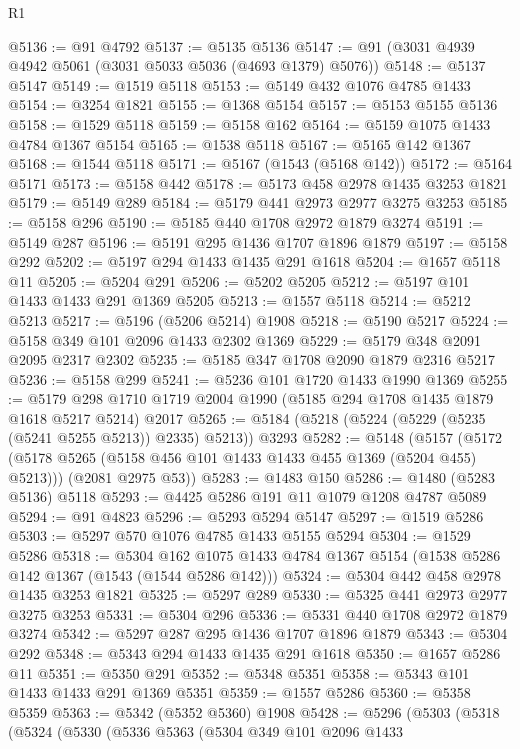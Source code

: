\begin{lexlean}{R1}
\begin{coremodule}
@5136 := @91 @4792
@5137 := @5135 @5136
@5147 := @91 (@3031 @4939 @4942 @5061 (@3031 @5033 @5036 (@4693 @1379) @5076))
@5148 := @5137 @5147
@5149 := @1519 @5118
@5153 := @5149 @432 @1076 @4785 @1433
@5154 := @3254 @1821
@5155 := @1368 @5154
@5157 := @5153 @5155 @5136
@5158 := @1529 @5118
@5159 := @5158 @162
@5164 := @5159 @1075 @1433 @4784 @1367 @5154
@5165 := @1538 @5118
@5167 := @5165 @142 @1367
@5168 := @1544 @5118
@5171 := @5167 (@1543 (@5168 @142))
@5172 := @5164 @5171
@5173 := @5158 @442
@5178 := @5173 @458 @2978 @1435 @3253 @1821
@5179 := @5149 @289
@5184 := @5179 @441 @2973 @2977 @3275 @3253
@5185 := @5158 @296
@5190 := @5185 @440 @1708 @2972 @1879 @3274
@5191 := @5149 @287
@5196 := @5191 @295 @1436 @1707 @1896 @1879
@5197 := @5158 @292
@5202 := @5197 @294 @1433 @1435 @291 @1618
@5204 := @1657 @5118 @11
@5205 := @5204 @291
@5206 := @5202 @5205
@5212 := @5197 @101 @1433 @1433 @291 @1369 @5205
@5213 := @1557 @5118
@5214 := @5212 @5213
@5217 := @5196 (@5206 @5214) @1908
@5218 := @5190 @5217
@5224 := @5158 @349 @101 @2096 @1433 @2302 @1369
@5229 := @5179 @348 @2091 @2095 @2317 @2302
@5235 := @5185 @347 @1708 @2090 @1879 @2316 @5217
@5236 := @5158 @299
@5241 := @5236 @101 @1720 @1433 @1990 @1369
@5255 := @5179 @298 @1710 @1719 @2004 @1990 (@5185 @294 @1708 @1435 @1879 @1618 @5217 @5214) @2017
@5265 := @5184 (@5218 (@5224 (@5229 (@5235 (@5241 @5255 @5213)) @2335) @5213)) @3293
@5282 := @5148
    (@5157
      (@5172 (@5178 @5265 (@5158 @456 @101 @1433 @1433 @455 @1369 (@5204 @455) @5213)))
      (@2081 @2975 @53))
@5283 := @1483 @150
@5286 := @1480 (@5283 @5136) @5118
@5293 := @4425 @5286 @191 @11 @1079 @1208 @4787 @5089
@5294 := @91 @4823
@5296 := @5293 @5294 @5147
@5297 := @1519 @5286
@5303 := @5297 @570 @1076 @4785 @1433 @5155 @5294
@5304 := @1529 @5286
@5318 := @5304
    @162
    @1075
    @1433
    @4784
    @1367
    @5154
    (@1538 @5286 @142 @1367 (@1543 (@1544 @5286 @142)))
@5324 := @5304 @442 @458 @2978 @1435 @3253 @1821
@5325 := @5297 @289
@5330 := @5325 @441 @2973 @2977 @3275 @3253
@5331 := @5304 @296
@5336 := @5331 @440 @1708 @2972 @1879 @3274
@5342 := @5297 @287 @295 @1436 @1707 @1896 @1879
@5343 := @5304 @292
@5348 := @5343 @294 @1433 @1435 @291 @1618
@5350 := @1657 @5286 @11
@5351 := @5350 @291
@5352 := @5348 @5351
@5358 := @5343 @101 @1433 @1433 @291 @1369 @5351
@5359 := @1557 @5286
@5360 := @5358 @5359
@5363 := @5342 (@5352 @5360) @1908
@5428 := @5296
    (@5303
      (@5318
        (@5324
          (@5330
            (@5336
              @5363
              (@5304
                @349
                @101
                @2096
                @1433

\end{coremodule}
\end{lexlean}
